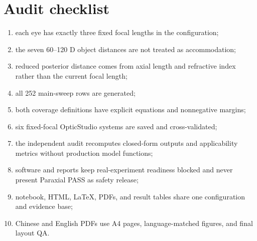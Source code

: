 \documentclass[11pt,openany]{report}
\begin{document}
\chapter{Audit checklist}
\begin{enumerate}[leftmargin=2.2em]
  \item each eye has exactly three fixed focal lengths in the configuration;
  \item the seven 60--120 D object distances are not treated as accommodation;
  \item reduced posterior distance comes from axial length and refractive index rather than the current focal length;
  \item all 252 main-sweep rows are generated;
  \item both coverage definitions have explicit equations and nonnegative margins;
  \item six fixed-focal OpticStudio systems are saved and cross-validated;
  \item the independent audit recomputes closed-form outputs and applicability metrics without production model functions;
  \item software and reports keep real-experiment readiness blocked and never present Paraxial PASS as safety release;
  \item notebook, HTML, LaTeX, PDFs, and result tables share one configuration and evidence base;
  \item Chinese and English PDFs use A4 pages, language-matched figures, and final layout QA.
\end{enumerate}
\end{document}
